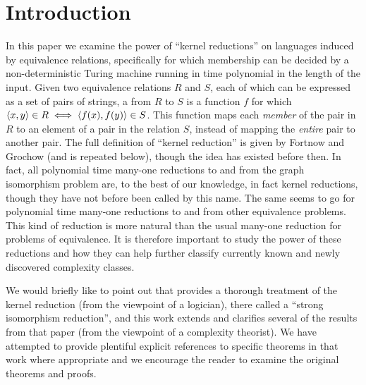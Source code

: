 \section{Introduction}


In this paper we examine the power of ``kernel reductions'' on languages induced by equivalence relations, specifically for which membership can be decided by a non-deterministic Turing machine running in time polynomial in the length of the input.
Given two equivalence relations $R$ and $S$, each of which can be expressed as a set of pairs of strings, a  from $R$ to $S$ is a function $f$ for which $\left\langle x,y\right\rangle\in R\iff\left\langle f(x),f(y)\right\rangle\in S$.
This function maps each \emph{member} of the pair in $R$ to an element of a pair in the relation $S$, instead of mapping the \emph{entire} pair to another pair.
The full definition of ``kernel reduction'' is given by Fortnow and Grochow \autocite{fg11} (and is repeated below), though the idea has existed before then.
In fact, all polynomial time many-one reductions to and from the graph isomorphism problem are, to the best of our knowledge, in fact kernel reductions, though they have not before been called by this name.
The same seems to go for polynomial time many-one reductions to and from other equivalence problems.
This kind of reduction is more natural than the usual many-one reduction for problems of equivalence.
It is therefore important to study the power of these reductions and how they can help further classify currently known and newly discovered complexity classes.

We would briefly like to point out that \autocite{bcffm} provides a thorough treatment of the kernel reduction (from the viewpoint of a logician), there called a ``strong isomorphism reduction'', and this work extends and clarifies several of the results from that paper (from the viewpoint of a complexity theorist).
We have attempted to provide plentiful explicit references to specific theorems in that work where appropriate and we encourage the reader to examine the original theorems and proofs.


